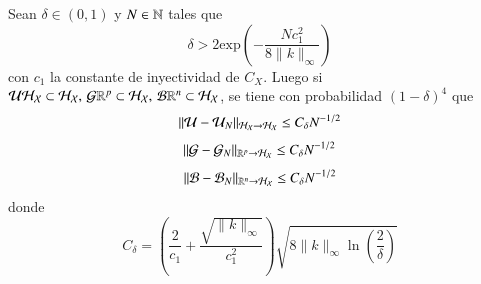 \begin{teo}
Sean $\delta \in (0, 1)$ y $N \in \mathbb{N}$ tales que
\[
\delta > 2 \text{exp} \left ( -\frac{Nc_1^2}{8\|k\|_\infty}\right )
\]
con $c_1$ la constante de inyectividad de $C_X$. Luego si $\mathcal{U} \mathcal{H}_{\mathcal{X}} \subset \mathcal{H}_{\mathcal{X}}, \, \mathcal{G} \mathbb{R}^p \subset \mathcal{H}_{\mathcal{X}}, \, \mathcal{B} \mathbb{R}^n \subset \mathcal{H}_{\mathcal{X}}$, se tiene con probabilidad $(1-\delta)^4$ que 
 \begin{equation*}
    \| \mathcal{U} - \mathcal{U}_N \|_{\mathcal{H}_{\mathcal{X}} \to \mathcal{H}_{\mathcal{X}}} \leq C_\delta N^{-1/2}
\end{equation*}
\begin{equation*}
\| \mathcal{G} - \mathcal{G}_N \|_{\mathbb{R}^p \to \mathcal{H}_{\mathcal{X}}} \leq C_\delta N^{-1/2}
\end{equation*}
\begin{equation*}
\| \mathcal{B} - \mathcal{B}_N \|_{\mathbb{R}^n \to \mathcal{H}_{\mathcal{X}}} \leq C_\delta N^{-1/2}
\end{equation*}
donde 
\[
C_\delta = \left ( \frac{2}{c_1} + \frac{\sqrt{\| k \|_{\infty}}}{c_1^2}
  \right )\sqrt{8 \| k \|_\infty \ln \left ( \frac{2}{\delta}\right ) }
\]
\end{teo}

